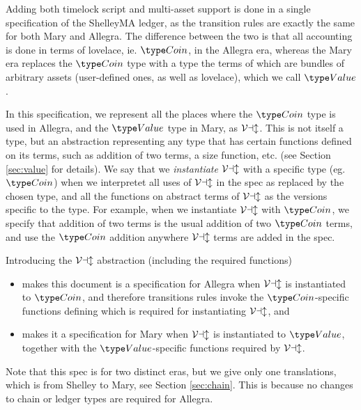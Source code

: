 Adding both timelock script and multi-asset support is done in a single specification
of the ShelleyMA ledger, as the transition rules are exactly the same for both
Mary and Allegra. The difference between the two is that all accounting is
done in terms of lovelace, ie. $\Coin$, in the Allegra era, whereas the Mary era
replaces the $\Coin$ type with a type the terms of which are bundles of arbitrary assets
(user-defined ones, as well as lovelace), which we call $\Value$.

In this specification, we represent all the places where the $\Coin$ type is used in Allegra,
and the $\Value$ type in Mary, as $\mathcal{Val}$. This is not itself a type, but an
abstraction representing any type that has certain functions defined on its terms,
such as addition of two terms,
a size function, etc. (see Section \ref{sec:value} for details). We say that we
\emph{instantiate} $\mathcal{Val}$ with a specific type (eg. $\Coin$) when we interpretet all
uses of $\mathcal{Val}$ in the spec as replaced by the chosen type, and all the functions
on abstract terms of $\mathcal{Val}$ as the versions specific to the type. For example,
when we instantiate $\mathcal{Val}$ with $\Coin$, we specify that
addition of two terms is the usual addition of two $\Coin$ terms, and use
the $\Coin$ addition anywhere $\mathcal{Val}$ terms are added in the spec.

Introducing the $\mathcal{Val}$ abstraction (including the required
functions)
\begin{itemize}
  \item makes this document is a specification for Allegra when $\mathcal{Val}$
  is instantiated to $\Coin$, and therefore transitions rules invoke the $\Coin$-specific functions
  defining which is required for instantiating $\mathcal{Val}$, and
  \item makes it a specification for Mary when $\mathcal{Val}$
  is instantiated to $\Value$, together with the $\Value$-specific functions required by $\mathcal{Val}$.
\end{itemize}

Note that this spec is for two distinct eras, but we give only one translations, which is
from Shelley to Mary, see Section \ref{sec:chain}. This is because no changes to
chain or ledger types are required for Allegra.
